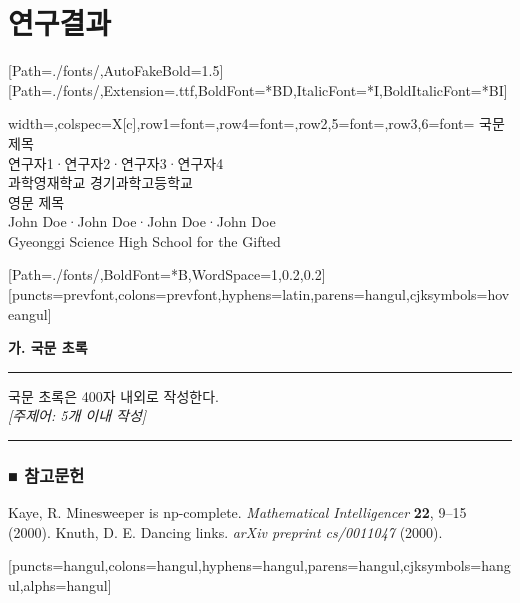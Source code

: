 \documentclass[10pt]{article}
\renewenvironment{abstract}
{\begin{center}\fontsize{12}{12}\selectfont\bfseries 가. 국문 초록\end{center}
	\hrule
	\setlength{\parindent}{7pt}\setlength{\parskip}{0.25\baselineskip plus 2pt}\par}
{\vspace{6pt}\hrule}
\newenvironment{paper}
{\setlength{\leftskip}{1ex}
	\setlength{\parindent}{7pt}\setlength{\parskip}{0.25\baselineskip plus 2pt}
	\setcounter{table}{0}}
{\clearpage}
\begin{document}
	\part{연구결과}
	\bigskip\bigskip
\bgroup
	[Path=./fonts/,AutoFakeBold=1.5]
	\setmainfont{TIMES}[Path=./fonts/,Extension=.ttf,BoldFont=*BD,ItalicFont=*I,BoldItalicFont=*BI]
	\begin{tblr}{width=\textwidth,colspec={X[c]},row{1}={font=\bfseries\fontsize{16}{16}\selectfont},row{4}={font=\fontsize{12}{12}\selectfont\bfseries},row{2,5}={font=\color{gray}},row{3,6}={font=\fontsize{9}{9}\selectfont\color{gray}}}
		{국문 제목} \\[.5ex]
		{연구자1·연구자2·연구자3·연구자4}\\[-1em]
		{과학영재학교 경기과학고등학교}\\[1ex]
		{영문 제목}\\[.5ex]
		{John Doe·John Doe·John Doe·John Doe}\\[-1em]
		Gyeonggi Science High School for the Gifted\\
	\end{tblr}
	[Path=./fonts/,BoldFont=*B,WordSpace={1,0.2,0.2}]
	[puncts=prevfont,colons=prevfont,hyphens=latin,parens=hangul,cjksymbols=hoveangul]
\egroup
\begin{abstract}
	 국문 초록은 400자 내외로 작성한다.\\
	\emph{[주제어: 5개 이내 작성]}
\end{abstract}
\begin{paper}







\section*{■ 참고문헌}
\renewcommand{\refname}{}
\vspace*{-3em}
\begin{thebibliography}{9}
    Kaye, R. Minesweeper is np-complete. \textit{Mathematical Intelligencer} \textbf{22}, 9–15 (2000).
    Knuth, D. E. Dancing links. \textit{arXiv preprint cs/0011047} (2000).
\end{thebibliography}
\end{paper}
\bgroup
{}[puncts=hangul,colons=hangul,hyphens=hangul,parens=hangul,cjksymbols=hangul,alphs=hangul]
\end{document}
